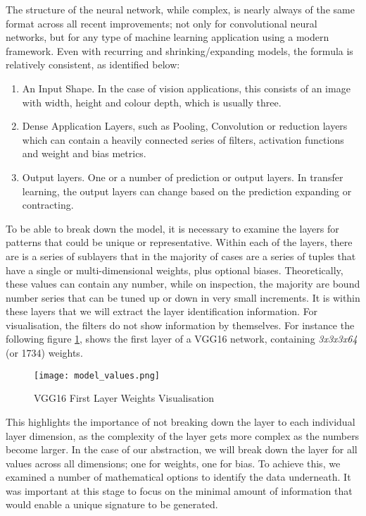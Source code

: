 The structure of the neural network, while complex, is nearly always of the same format across all recent improvements; not only for convolutional neural networks, but for any type of machine learning application using a modern framework. Even with recurring and shrinking/expanding models, the formula is relatively consistent, as identified below:

\begin{enumerate}
\item An Input Shape. In the case of vision applications, this consists of an image with width, height and colour depth, which is usually three.
\item Dense Application Layers, such as Pooling, Convolution or reduction layers which can contain a heavily connected series of filters, activation functions and weight and bias metrics.
\item Output layers. One or a number of prediction or output layers. In transfer learning, the output layers can change based on the prediction expanding or contracting.
\end{enumerate}

To be able to break down the model, it is necessary to examine the layers for patterns that could be unique or representative. Within each of the layers, there are is a series of sublayers that in the majority of cases are a series of tuples that have a single or multi-dimensional weights, plus optional biases. Theoretically, these values can contain any number, while on inspection, the majority are bound number series that can be tuned up or down in very small increments. It is within these layers that we will extract the layer identification information. For visualisation, the filters do not show information by themselves. For instance the following figure \ref{fig:vggWeightVisualisation}, shows the first layer of a VGG16 network\cite{brownlee_how_2019}, containing \textit{3x3x3x64} (or 1734) weights.

\begin{figure}[!ht]
    \centering
    \texttt{[image: model\_values.png]}
    \caption{VGG16 First Layer Weights Visualisation}
    \label{fig:vggWeightVisualisation}
\end{figure}

This highlights the importance of not breaking down the layer to each individual layer dimension, as the complexity of the layer gets more complex as the numbers become larger. In the case of our abstraction, we will break down the layer for all values across all dimensions; one for weights, one for bias. To achieve this, we examined a number of mathematical options to identify the data underneath. It was important at this stage to focus on the minimal amount of information that would enable a unique signature to be generated.

